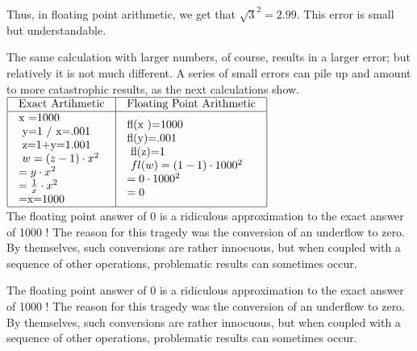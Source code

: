 \documentclass[../main.tex]{subfiles}
\begin{document}
Thus, in floating point arithmetic, we get that $\sqrt{3}^{2}=2.99$. This error is small but understandable.

The same calculation with larger numbers, of course, results in a larger error; but relatively it is not much different. A series of small errors can pile up and amount to more catastrophic results, as the next calculations show.\\

$
\begin{array}{|l|l|}
\hline \begin{array}{l}
\text {Exact Artihmetic}
\end{array} & \begin{array}{l}
\text{Floating Point Arithmetic}
\end{array} \\
\hline \begin{array}{l}
\text{x =1000} \\
\text{ y=1 / x=.001} \\
\text{ z=1+y=1.001} \\
\text{ $w=(z-1) \cdot x^{2}$} \\
\text{$=y \cdot x^{2}$ }\\
\text{$=\frac{1}{x} \cdot x^{2}$ }\\
\text{=x=1000 }
\end{array} & \begin{array}{l}
\text{fl(x )=1000} \\
\text{fl(y)=.001} \\
\text{ fl(z)=1} \\
\text{ $fl(w)=(1-1) \cdot 1000^{2}$} \\
\text{$=0 \cdot 1000^{2}$ }\\
\text{$=0$}\\
\end{array} \\
\hline
\end{array}
$ \\



The floating point answer of 0 is a ridiculous approximation to the exact answer of 1000 ! The reason for this tragedy was the conversion of an underflow to zero. By themselves, such conversions are rather innocuous, but when coupled with a sequence of other operations, problematic results can sometimes occur.

The floating point answer of 0 is a ridiculous approximation to the exact answer of 1000 ! The reason for this tragedy was the conversion of an underflow to zero. By themselves, such conversions are rather innocuous, but when coupled with a sequence of other operations, problematic results can sometimes occur.
\end{document}
